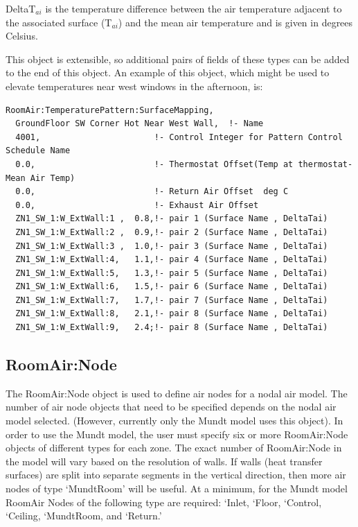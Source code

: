 DeltaT\(_{ai}\) is the temperature difference between the air temperature adjacent to the associated surface (T\(_{ai}\)) and the mean air temperature and is given in degrees Celsius.

This object is extensible, so additional pairs of fields of these types can be added to the end of this object.  An example of this object, which might be used to elevate temperatures near west windows in the afternoon, is:

\begin{lstlisting}
RoomAir:TemperaturePattern:SurfaceMapping,
  GroundFloor SW Corner Hot Near West Wall,  !- Name
  4001,                       !- Control Integer for Pattern Control Schedule Name
  0.0,                        !- Thermostat Offset(Temp at thermostat- Mean Air Temp)
  0.0,                        !- Return Air Offset  deg C
  0.0,                        !- Exhaust Air Offset
  ZN1_SW_1:W_ExtWall:1 ,  0.8,!- pair 1 (Surface Name , DeltaTai)
  ZN1_SW_1:W_ExtWall:2 ,  0.9,!- pair 2 (Surface Name , DeltaTai)
  ZN1_SW_1:W_ExtWall:3 ,  1.0,!- pair 3 (Surface Name , DeltaTai)
  ZN1_SW_1:W_ExtWall:4,   1.1,!- pair 4 (Surface Name , DeltaTai)
  ZN1_SW_1:W_ExtWall:5,   1.3,!- pair 5 (Surface Name , DeltaTai)
  ZN1_SW_1:W_ExtWall:6,   1.5,!- pair 6 (Surface Name , DeltaTai)
  ZN1_SW_1:W_ExtWall:7,   1.7,!- pair 7 (Surface Name , DeltaTai)
  ZN1_SW_1:W_ExtWall:8,   2.1,!- pair 8 (Surface Name , DeltaTai)
  ZN1_SW_1:W_ExtWall:9,   2.4;!- pair 8 (Surface Name , DeltaTai)
\end{lstlisting}

\subsection{RoomAir:Node}\label{roomairnode}

The RoomAir:Node object is used to define air nodes for a nodal air model. The number of air node objects that need to be specified depends on the nodal air model selected. (However, currently only the Mundt model uses this object). In order to use the Mundt model, the user must specify six or more RoomAir:Node objects of different types for each zone. The exact number of RoomAir:Node in the model will vary based on the resolution of walls. If walls (heat transfer surfaces) are split into separate segments in the vertical direction, then more air nodes of type `MundtRoom' will be useful. At a minimum, for the Mundt model RoomAir Nodes of the following type are required: `Inlet, `Floor, `Control, `Ceiling, `MundtRoom, and `Return.'


